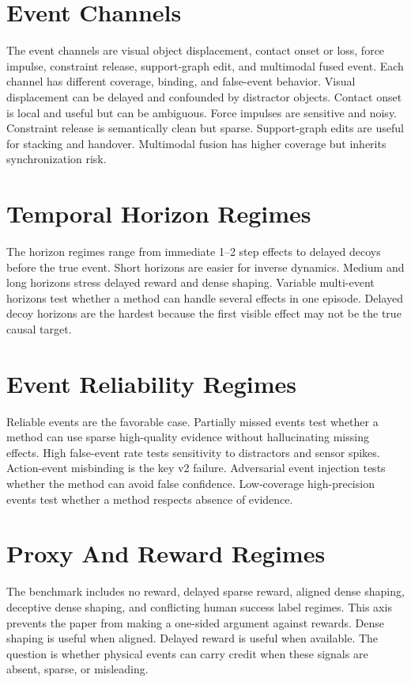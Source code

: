 \documentclass{article}
\begin{document}
\section{Event Channels}

The event channels are visual object displacement, contact onset or loss, force impulse, constraint release, support-graph edit, and multimodal fused event. Each channel has different coverage, binding, and false-event behavior. Visual displacement can be delayed and confounded by distractor objects. Contact onset is local and useful but can be ambiguous. Force impulses are sensitive and noisy. Constraint release is semantically clean but sparse. Support-graph edits are useful for stacking and handover. Multimodal fusion has higher coverage but inherits synchronization risk.

\section{Temporal Horizon Regimes}

The horizon regimes range from immediate 1--2 step effects to delayed decoys before the true event. Short horizons are easier for inverse dynamics. Medium and long horizons stress delayed reward and dense shaping. Variable multi-event horizons test whether a method can handle several effects in one episode. Delayed decoy horizons are the hardest because the first visible effect may not be the true causal target.

\section{Event Reliability Regimes}

Reliable events are the favorable case. Partially missed events test whether a method can use sparse high-quality evidence without hallucinating missing effects. High false-event rate tests sensitivity to distractors and sensor spikes. Action-event misbinding is the key v2 failure. Adversarial event injection tests whether the method can avoid false confidence. Low-coverage high-precision events test whether a method respects absence of evidence.

\section{Proxy And Reward Regimes}

The benchmark includes no reward, delayed sparse reward, aligned dense shaping, deceptive dense shaping, and conflicting human success label regimes. This axis prevents the paper from making a one-sided argument against rewards. Dense shaping is useful when aligned. Delayed reward is useful when available. The question is whether physical events can carry credit when these signals are absent, sparse, or misleading.
\end{document}
